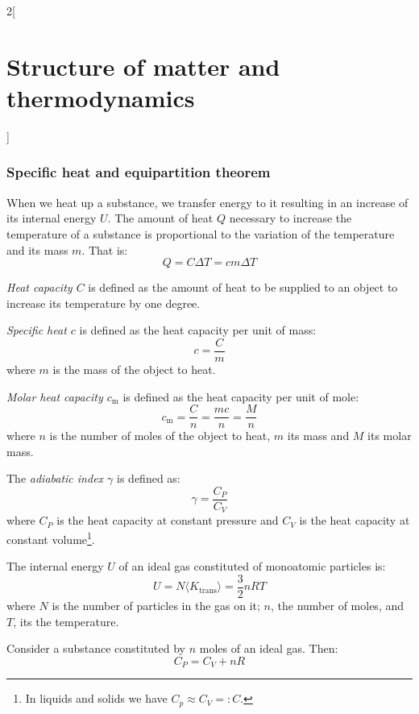 \documentclass[../../../main.tex]{subfiles}
\begin{document}
\begin{multicols}{2}[\section{Structure of matter and thermodynamics}]
    \subsubsection{Specific heat and equipartition theorem}
    \begin{definition}
        When we heat up a substance, we transfer energy to it resulting in an increase of its internal energy $U$. The amount of heat $Q$ necessary to increase the temperature of a substance is proportional to the variation of the temperature and its mass $m$. That is:
        $$Q=C\Delta T=cm\Delta T$$
    \end{definition}
    \begin{definition}
        \textit{Heat capacity $C$} is defined as the amount of heat to be supplied to an object to increase its temperature by one degree.
    \end{definition}
    \begin{definition}
        \textit{Specific heat $c$} is defined as the heat capacity per unit of mass: $$c=\frac{C}{m}$$ where $m$ is the mass of the object to heat.
    \end{definition}
    \begin{definition}
        \textit{Molar heat capacity $c_\text{m}$} is defined as the heat capacity per unit of mole: $$c_\text{m}=\frac{C}{n}=\frac{mc}{n}=\frac{M}{n}$$ where $n$ is the number of moles of the object to heat, $m$ its mass and $M$ its molar mass.
    \end{definition}
    \begin{definition}
        The \textit{adiabatic index $\gamma$} is defined as:
        $$\gamma=\frac{C_P}{C_V}$$
        where $C_P$ is the heat capacity at constant pressure and $C_V$ is the heat capacity at constant volume\footnote{In liquids and solids we have $C_p\approx C_V=:C$.}.
    \end{definition}
    \begin{definition}
        The internal energy $U$ of an ideal gas constituted of monoatomic particles is:
        $$U=N\langle K_\text{trans}\rangle=\frac{3}{2}nRT$$
        where $N$ is the number of particles in the gas on it; $n$, the number of moles, and $T$, its the temperature.
    \end{definition}
    \begin{prop}
        Consider a substance constituted by $n$ moles of an ideal gas. Then:
        $$C_P=C_V+nR$$
    \end{prop}
    \begin{prop}

\end{prop}
\end{multicols}
\end{document}
